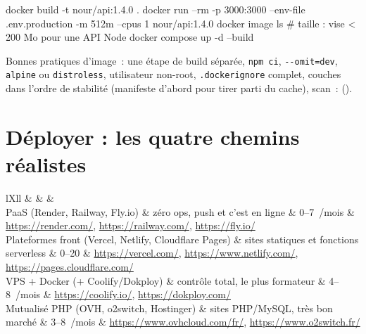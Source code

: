 \begin{terminal}
docker build -t nour/api:1.4.0 .
docker run --rm -p 3000:3000 --env-file .env.production -m 512m --cpus 1 nour/api:1.4.0
docker image ls          # taille : vise < 200 Mo pour une API Node
docker compose up -d --build
\end{terminal}

Bonnes pratiques d'image~: une \'etape de build s\'epar\'ee, \verb|npm ci|, \verb|--omit=dev|,
\verb|alpine| ou \verb|distroless|, utilisateur non-root, \verb|.dockerignore| complet,
couches dans l'ordre de stabilit\'e (manifeste d'abord pour tirer parti du cache),
scan~:  ().

\section{D\'eployer : les quatre chemins r\'ealistes}

\begin{tabz}{lXll}
  \headrow {} \&  \&  \&  \\
  \midrule
  PaaS (Render, Railway, Fly.io) \& z\'ero ops, push et c'est en ligne \& 0--7~/mois \& \url{https://render.com/}, \url{https://railway.com/}, \url{https://fly.io/} \\
  Plateformes front (Vercel, Netlify, Cloudflare Pages) \& sites statiques et fonctions serverless \& 0--20 \& \url{https://vercel.com/}, \url{https://www.netlify.com/}, \url{https://pages.cloudflare.com/} \\
  VPS + Docker (+ Coolify/Dokploy) \& contr\^ole total, le plus formateur \& 4--8~/mois \& \url{https://coolify.io/}, \url{https://dokploy.com/} \\
  Mutualis\'e PHP (OVH, o2switch, Hostinger) \& sites PHP/MySQL, tr\`es bon march\'e \& 3--8~/mois \& \url{https://www.ovhcloud.com/fr/}, \url{https://www.o2switch.fr/} \\
\end{tabz}

